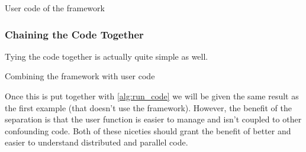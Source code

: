 \begin{algorithm}
\begin{algorithmic}
\EndFunction{}
\end{algorithmic}
\caption{User code of the framework}
\label{alg:ocmf_user_code}
\end{algorithm}

\subsubsection{Chaining the Code Together}

Tying the code together is actually quite simple as well.

\begin{algorithm}
\begin{algorithmic}
     
    \Else {}
    \EndIf{}
\EndFunction{}
\end{algorithmic}
\caption{Combining the framework with user code}
\label{alg:run_code}
\end{algorithm}

Once this is put together with \cref{alg:run_code} we will be given the same
result as the first example (that doesn't use the framework). However, the
benefit of the separation is that the user function is easier to manage and
isn't coupled to other confounding code. Both of these niceties should grant
the benefit of better and easier to understand distributed and parallel code.
